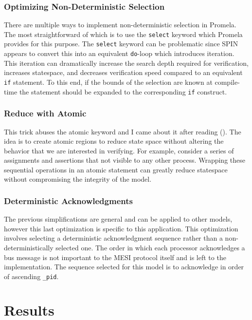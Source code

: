 \documentclass[12pt]{article}
\begin{document}
\subsubsection{Optimizing Non-Deterministic Selection}

There are multiple ways to implement non-deterministic selection in Promela. The most straightforward of which is to use the \texttt{select} keyword which Promela provides for this purpose. The \texttt{select} keyword can be problematic since SPIN appears to convert this into an equivalent \texttt{do}-loop which introduces iteration. This iteration can dramatically increase the search depth required for verification, increases statespace, and decreases verification speed compared to an equivalent \texttt{if} statement. To this end, if the bounds of the selection are known at compile-time the statement should be expanded to the corresponding \texttt{if} construct.

\subsubsection{Reduce with Atomic}

This trick abuses the atomic keyword and I came about it after reading (\cite{mckenney2007}).  The idea is to create atomic regions to reduce state space without altering the behavior that we are interested in verifying. For example, consider a series of assignments and assertions that not visible to any other process. Wrapping these sequential operations in an atomic statement can greatly reduce statespace without compromising the integrity of the model.

\subsubsection{Deterministic Acknowledgments}

The previous simplifications are general and can be applied to other models, however this last optimization is specific to this application. This optimization involves selecting a deterministic acknowledgment sequence rather than a non-deterministically selected one. The order in which each processor acknowledges a bus message is not important to the MESI protocol itself and is left to the implementation. The sequence selected for this model is to acknowledge in order of ascending \texttt{\_pid}.


\section{Results} \label{results}
\end{document}

